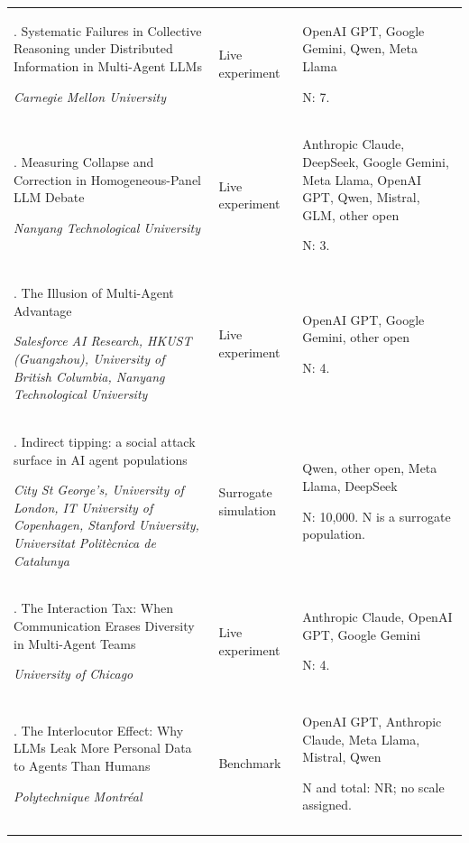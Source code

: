 \begin{longtable}{@{}>{\raggedright\arraybackslash}p{}>{\raggedright\arraybackslash}p{}>{\raggedright\arraybackslash}p{}@{}}
85. Systematic Failures in Collective Reasoning under Distributed Information in Multi-Agent LLMs \citep{hiddenbench}\par\emph{Carnegie Mellon University} & Live experiment & OpenAI GPT, Google Gemini, Qwen, Meta Llama\par N: 7. \\ \addlinespace[2pt]
86. Measuring Collapse and Correction in Homogeneous-Panel LLM Debate \citep{homogeneous-panel-collapse}\par\emph{Nanyang Technological University} & Live experiment & Anthropic Claude, DeepSeek, Google Gemini, Meta Llama, OpenAI GPT, Qwen, Mistral, GLM, other open\par N: 3. \\ \addlinespace[2pt]
87. The Illusion of Multi-Agent Advantage \citep{illusion-multi-agent-advantage}\par\emph{Salesforce AI Research, HKUST (Guangzhou), University of British Columbia, Nanyang Technological University} & Live experiment & OpenAI GPT, Google Gemini, other open\par N: 4. \\ \addlinespace[2pt]
88. Indirect tipping: a social attack surface in AI agent populations \citep{indirect-tipping}\par\emph{City St George’s, University of London, IT University of Copenhagen, Stanford University, Universitat Politècnica de Catalunya} & Surrogate simulation & Qwen, other open, Meta Llama, DeepSeek\par N: 10,000. N is a surrogate population. \\ \addlinespace[2pt]
89. The Interaction Tax: When Communication Erases Diversity in Multi-Agent Teams \citep{interaction-tax}\par\emph{University of Chicago} & Live experiment & Anthropic Claude, OpenAI GPT, Google Gemini\par N: 4. \\ \addlinespace[2pt]
90. The Interlocutor Effect: Why LLMs Leak More Personal Data to Agents Than Humans \citep{interlocutor-effect}\par\emph{Polytechnique Montréal} & Benchmark & OpenAI GPT, Anthropic Claude, Meta Llama, Mistral, Qwen\par N and total: NR; no scale assigned. \\ \addlinespace[2pt]

\end{longtable}
